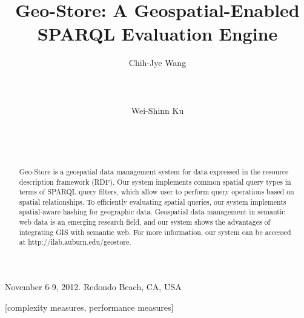 \documentclass{sig-alternate}
\begin{document}
\title{Geo-Store: A Geospatial-Enabled SPARQL Evaluation Engine}

\author{
\alignauthor
Chih-Jye Wang\\
    \\
    \\
    \\
\alignauthor
Wei-Shinn Ku\\
    \\
    \\
    \\
}

 {November 6-9, 2012. Redondo Beach, CA,
USA}

\maketitle

\begin{abstract}
Geo-Store is a geospatial data management system for data expressed in the resource description framework (RDF). Our system implements common spatial query types in terms of SPARQL query filters, which allow user to perform query operations based on spatial relationships. To efficiently evaluating spatial queries, our system implements spatial-aware hashing for geographic data. Geospatial data management in semantic web data is an emerging research field, and our system shows the advantages of integrating GIS with semantic web. For more information, our system can be accessed at http://ilab.auburn.edu/geostore.
\end{abstract}

[complexity measures, performance measures]




%



%


\balancecolumns
\end{document}
